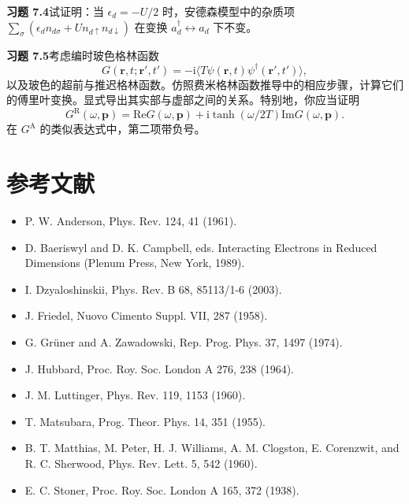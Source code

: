 \textbf{习题 7.4}\quad 试证明：当 $\epsilon_{d} = -U/2$ 时，安德森模型中的杂质项 $\sum_{\sigma}\left(\epsilon_{d}n_{d\sigma} + Un_{d\uparrow}n_{d\downarrow}\right)$ 在变换 $a^{\dagger}_{d} \leftrightarrow a_{d}$ 下不变。

\textbf{习题 7.5}\quad 考虑编时玻色格林函数
\begin{equation*}
G(\mathbf{r},t;\mathbf{r}',t') = -\mathrm{i}\langle T\psi(\mathbf{r},t)\psi^{\dagger}(\mathbf{r}',t')\rangle,
\tag{7.142}
\end{equation*}
以及玻色的超前与推迟格林函数。仿照费米格林函数推导中的相应步骤，计算它们的傅里叶变换。显式导出其实部与虚部之间的关系。特别地，你应当证明
\begin{equation*}
G^{\mathrm{R}}(\omega,\mathbf{p}) = \mathrm{Re}G(\omega,\mathbf{p}) + \mathrm{i}\tanh(\omega/2T)\mathrm{Im}G(\omega,\mathbf{p}).
\tag{7.143}
\end{equation*}
在 $G^{\mathrm{A}}$ 的类似表达式中，第二项带负号。

\section*{参考文献}

\begin{itemize}[leftmargin=2em,itemsep=0pt,parsep=0pt,label={}]
\item [{[A1961]}] P. W. Anderson, Phys. Rev. 124, 41 (1961).
\item [{[BC1989]}] D. Baeriswyl and D. K. Campbell, eds. Interacting Electrons in Reduced Dimensions (Plenum Press, New York, 1989).
\item [{[D2003]}] I. Dzyaloshinskii, Phys. Rev. B 68, 85113/1-6 (2003).
\item [{[F1958]}] J. Friedel, Nuovo Cimento Suppl. VII, 287 (1958).
\item [{[GZ1974]}] G. Grüner and A. Zawadowski, Rep. Prog. Phys. 37, 1497 (1974).
\item [{[H1964]}] J. Hubbard, Proc. Roy. Soc. London A 276, 238 (1964).
\item [{[L1960]}] J. M. Luttinger, Phys. Rev. 119, 1153 (1960).
\item [{[M1955]}] T. Matsubara, Prog. Theor. Phys. 14, 351 (1955).
\item [{[M1960]}] B. T. Matthias, M. Peter, H. J. Williams, A. M. Clogston, E. Corenzwit, and R. C. Sherwood, Phys. Rev. Lett. 5, 542 (1960).
\item [{[S1938]}] E. C. Stoner, Proc. Roy. Soc. London A 165, 372 (1938).
\end{itemize}
